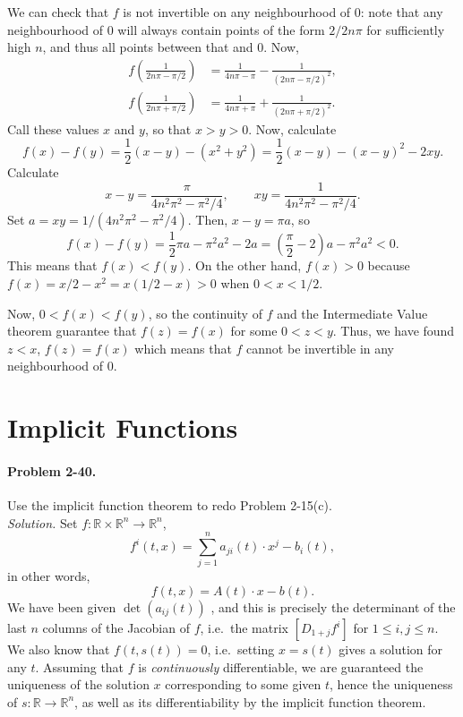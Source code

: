 \documentclass[11pt]{report}
\newcommand{\R}{\mathbb{R}}
\newcommand{\problem}[1]{\paragraph{Problem #1.}}
\newcommand{\solution}{\noindent\textit{Solution.} }
\begin{document}
    We can check that $f$ is not invertible on any neighbourhood of $0$: note that
    any neighbourhood of $0$ will always contain points of the form $2 / 2n\pi$ for
    sufficiently high $n$, and thus all points between that and $0$. Now,
    \begin{align*}
        f\left(\frac{1}{2n\pi - \pi / 2}\right) &= \frac{1}{4n\pi - \pi} -
        \frac{1}{(2n\pi - \pi / 2)^2}, \\
        f\left(\frac{1}{2n\pi + \pi / 2}\right) &= \frac{1}{4n\pi + \pi} +
        \frac{1}{(2n\pi + \pi / 2)^2}.
    \end{align*}
    Call these values $x$ and $y$, so that $x > y > 0$. Now, calculate \[
        f(x) - f(y) = \frac{1}{2}(x - y) - (x^2 + y^2) = \frac{1}{2}(x - y) - (x -
        y)^2 - 2xy.
    \] Calculate \[
        x - y = \frac{\pi}{4n^2\pi^2 - \pi^2 / 4}, \qquad
        xy = \frac{1}{4n^2\pi^2 - \pi^2 / 4}.
    \] Set $a = xy = 1 / (4n^2\pi^2 - \pi^2 / 4)$. Then, $x - y = \pi a$, so \[
        f(x) - f(y) = \frac{1}{2}\pi a - \pi^2a^2 - 2a = \left(\frac{\pi}{2} - 2\right)a -
        \pi^2a^2 < 0.
    \] This means that $f(x) < f(y)$. On the other hand, $f(x) > 0$ because $f(x) = x
    / 2 - x^2 = x(1 / 2 - x) > 0$ when $0 < x < 1 / 2$.

    Now, $0 < f(x) < f(y)$, so the continuity of $f$ and the Intermediate Value
    theorem guarantee that $f(z) = f(x)$ for some $0 < z < y$. Thus, we have found $z
    < x$, $f(z) = f(x)$ which means that $f$ cannot be invertible in any
    neighbourhood of $0$.



    \section{Implicit Functions}
    
    \problem{2-40} Use the implicit function theorem to redo Problem 2-15(c). \\

    \solution Set $f\colon \R\times \R^n \to \R^n$, \[
        f^{i}(t, x) = \sum_{j = 1}^n a_{ji}(t) \cdot x^j - b_i(t),
    \] in other words, \[
        f(t, x) = A(t)\cdot x - b(t).
    \] We have been given $\det(a_{ij}(t))$ , and this is precisely the
    determinant of the last $n$ columns of the Jacobian of $f$, i.e.\ the matrix
    $[D_{1 + j}f^i]$ for $1 \leq i, j \leq n$. We also know that $f(t, s(t)) = 0$,
    i.e.\ setting $x = s(t)$ gives a solution for any $t$.
    Assuming that $f$ is \emph{continuously} differentiable, we are guaranteed the
    uniqueness of the solution $x$ corresponding to some given $t$, hence the
    uniqueness of $s\colon \R \to \R^n$, as well as its differentiability by the
    implicit function theorem.
\end{document}
